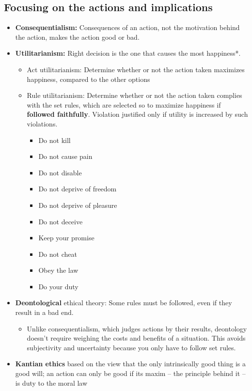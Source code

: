 \documentclass{article}
\begin{document}
\subsection{Focusing on the actions and implications}
\begin{itemize}
  \item \textbf{Consequentialism:} Consequences of an action, not the motivation behind the action, makes the action good or bad.
  \item \textbf{Utilitarianism:} Right decision is the one that causes the most happiness*.
  \begin{itemize}
    \item Act utilitarianism: Determine whether or not the action taken maximizes happiness, compared to the other options
    \item Rule utilitarianism: Determine whether or not the action taken complies with the set rules, which are selected so to maximize happiness if \textbf{followed faithfully}. Violation justified only if utility is increased by such violations.
    \begin{itemize}
      \item Do not kill
      \item Do not cause pain
      \item Do not disable
      \item Do not deprive of freedom
      \item Do not deprive of pleasure
      \item Do not deceive
      \item Keep your promise
      \item Do not cheat
      \item Obey the law
      \item Do your duty
    \end{itemize}
  \end{itemize}
  \item \textbf{Deontological} ethical theory: Some rules must be followed, even if they result in a bad end.
  \begin{itemize}
    \item Unlike consequentialism, which judges actions by their results, deontology doesn’t require weighing the costs and benefits of a situation. This avoids subjectivity and uncertainty because you only have to follow set rules.
  \end{itemize}
  \item \textbf{Kantian ethics} based on the view that the only intrinsically good thing is a good will; an action can only be good if its maxim – the principle behind it – is duty to the moral law

\end{itemize}
\end{document}
